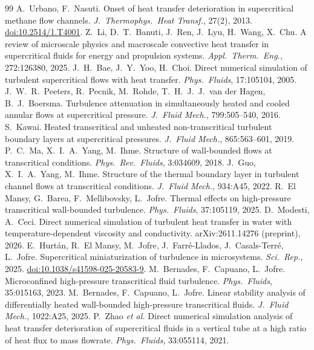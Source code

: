 \documentclass[11pt]{article}
\begin{document}
\begin{thebibliography}{99}
 A.\ Urbano, F.\ Nasuti. Onset of heat transfer deterioration in supercritical methane flow channels. \emph{J.\ Thermophys.\ Heat Transf.}, 27(2), 2013. \href{https://doi.org/10.2514/1.T4001}{doi:10.2514/1.T4001}.
 Z.\ Li, D.\ T.\ Banuti, J.\ Ren, J.\ Lyu, H.\ Wang, X.\ Chu. A review of microscale physics and macroscale convective heat transfer in supercritical fluids for energy and propulsion systems. \emph{Appl.\ Therm.\ Eng.}, 272:126380, 2025.
 J.\ H.\ Bae, J.\ Y.\ Yoo, H.\ Choi. Direct numerical simulation of turbulent supercritical flows with heat transfer. \emph{Phys.\ Fluids}, 17:105104, 2005.
 J.\ W.\ R.\ Peeters, R.\ Pecnik, M.\ Rohde, T.\ H.\ J.\ J.\ van der Hagen, B.\ J.\ Boersma. Turbulence attenuation in simultaneously heated and cooled annular flows at supercritical pressure. \emph{J.\ Fluid Mech.}, 799:505--540, 2016.
 S.\ Kawai. Heated transcritical and unheated non-transcritical turbulent boundary layers at supercritical pressures. \emph{J.\ Fluid Mech.}, 865:563--601, 2019.
 P.\ C.\ Ma, X.\ I.\ A.\ Yang, M.\ Ihme. Structure of wall-bounded flows at transcritical conditions. \emph{Phys.\ Rev.\ Fluids}, 3:034609, 2018.
 J.\ Guo, X.\ I.\ A.\ Yang, M.\ Ihme. Structure of the thermal boundary layer in turbulent channel flows at transcritical conditions. \emph{J.\ Fluid Mech.}, 934:A45, 2022.
 R.\ El Mansy, G.\ Barea, F.\ Mellibovsky, L.\ Jofre. Thermal effects on high-pressure transcritical wall-bounded turbulence. \emph{Phys.\ Fluids}, 37:105119, 2025.
 D.\ Modesti, A.\ Ceci. Direct numerical simulation of turbulent heat transfer in water with temperature-dependent viscosity and conductivity. arXiv:2611.14276 (preprint), 2026.
 E.\ Hurt\'an, R.\ El Mansy, M.\ Jofre, J.\ Farr\'e-Llados, J.\ Casals-Terr\'e, L.\ Jofre. Supercritical miniaturization of turbulence in microsystems. \emph{Sci.\ Rep.}, 2025. \href{https://doi.org/10.1038/s41598-025-20583-9}{doi:10.1038/s41598-025-20583-9}.
 M.\ Bernades, F.\ Capuano, L.\ Jofre. Microconfined high-pressure transcritical fluid turbulence. \emph{Phys.\ Fluids}, 35:015163, 2023.
 M.\ Bernades, F.\ Capuano, L.\ Jofre. Linear stability analysis of differentially heated wall-bounded high-pressure transcritical fluids. \emph{J.\ Fluid Mech.}, 1022:A25, 2025.
 P.\ Zhao \emph{et al.} Direct numerical simulation analysis of heat transfer deterioration of supercritical fluids in a vertical tube at a high ratio of heat flux to mass flowrate. \emph{Phys.\ Fluids}, 33:055114, 2021.

\end{thebibliography}
\end{document}
